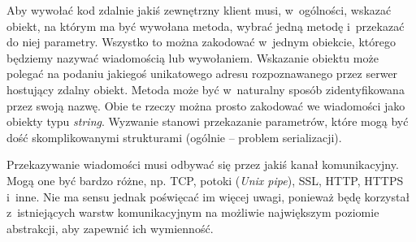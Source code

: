 Aby wywołać kod zdalnie jakiś zewnętrzny klient musi, w~ogólności, wskazać obiekt, na którym ma być wywołana metoda, wybrać jedną metodę i~przekazać do niej parametry. Wszystko to można zakodować w~jednym obiekcie, którego będziemy nazywać wiadomością lub wywołaniem.
Wskazanie obiektu może polegać na podaniu jakiegoś unikatowego adresu rozpoznawanego przez serwer hostujący zdalny obiekt.
Metoda może być w~naturalny sposób zidentyfikowana przez swoją nazwę.
Obie te rzeczy można prosto zakodować we wiadomości jako obiekty typu \emph{string}.
Wyzwanie stanowi przekazanie parametrów, które mogą być dość skomplikowanymi strukturami (ogólnie -- problem serializacji).

Przekazywanie wiadomości musi odbywać się przez jakiś kanał komunikacyjny. Mogą one być bardzo różne, np. TCP, potoki (\emph{Unix pipe}), SSL, HTTP, HTTPS i~inne.
Nie ma sensu jednak poświęcać im więcej uwagi, ponieważ będę korzystał z~istniejących warstw komunikacyjnym na możliwie największym poziomie abstrakcji, aby zapewnić ich wymienność.

%
%
%
%

%
%
%
%


